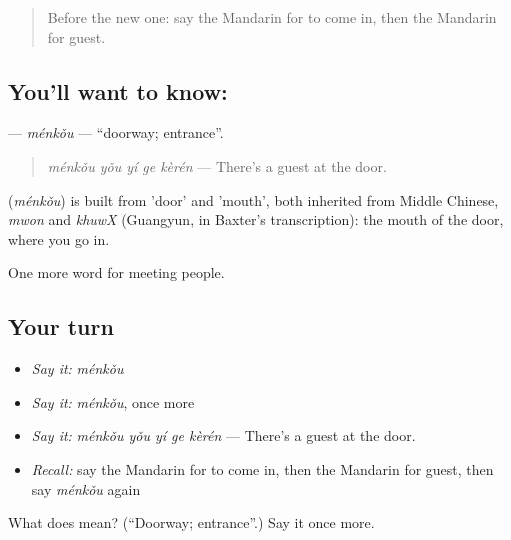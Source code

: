 \label{lesson:ZH-C74-menkou}



\begin{quote}
Before the new one: say the Mandarin for to come in, then the Mandarin for guest.
\end{quote}

\subsection*{You'll want to know: }
\textbf{} — \emph{ménkǒu} — \textquotedblleft{}doorway; entrance\textquotedblright{}.

\begin{quote}
\textbf{} \emph{ménkǒu yǒu yí ge kèrén} — There's a guest at the door.
\end{quote}

\begin{cousinweb}
\textbf{} (\emph{ménkǒu}) is built from  'door' and  'mouth', both inherited from Middle Chinese, \emph{mwon} and \emph{khuwX} (Guangyun, in Baxter's transcription): the mouth of the door, where you go in.
\end{cousinweb}

\begin{grammarlens}[title={What you've built}]
One more word for meeting people.
\end{grammarlens}

\subsection*{Your turn}
\begin{itemize}
\raggedright
  \item \emph{Say it:} \emph{ménkǒu}
  \item \emph{Say it:} \emph{ménkǒu}, once more
  \item \emph{Say it:} \emph{ménkǒu yǒu yí ge kèrén} — There's a guest at the door.
  \item \emph{Recall:} say the Mandarin for to come in, then the Mandarin for guest, then say \emph{ménkǒu} again
\end{itemize}

\begin{tcolorbox}[breakable,colback=teal!4,colframe=teal!35!black,title={Before you move on}]
What does  mean? (\textquotedblleft{}Doorway; entrance\textquotedblright{}.) Say it once more.
\end{tcolorbox}
